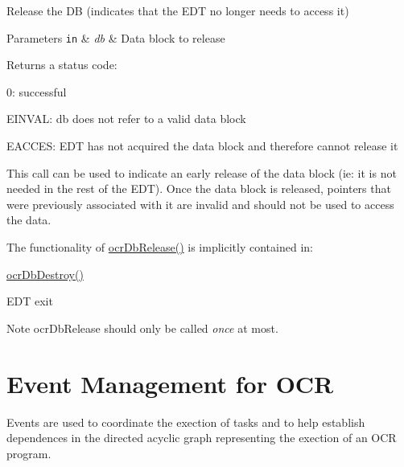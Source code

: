 Release the D\-B (indicates that the E\-D\-T no longer needs to access it)


\begin{DoxyParams}[1]{Parameters}
\mbox{\tt in}  & {\em db} & Data block to release\\
\hline
\end{DoxyParams}
\begin{DoxyReturn}{Returns}
a status code\-:
\begin{DoxyItemize}
\item 0\-: successful
\item E\-I\-N\-V\-A\-L\-: db does not refer to a valid data block
\item E\-A\-C\-C\-E\-S\-: E\-D\-T has not acquired the data block and therefore cannot release it
\end{DoxyItemize}
\end{DoxyReturn}

\descr
This call can be used to indicate an early release of the data block (ie\-: it is not needed in the rest of the E\-D\-T). Once the data block is released, pointers that were previously associated with it are invalid and should not be used to access the data.

The functionality of \hyperlink{group__OCRDataBlock_ga2ec03c0b0998bdaf9ccc44a06fb05ca0}{ocr\-Db\-Release()} is implicitly contained in\-:
\begin{DoxyItemize}
\item \hyperlink{group__OCRDataBlock_gabc80ea5594e5e55a541a1df4c7727821}{ocr\-Db\-Destroy()}
\item E\-D\-T exit
\end{DoxyItemize}

\begin{DoxyNote}{Note}
ocr\-Db\-Release should only be called {\itshape once} at most.
\end{DoxyNote}

\section{Event Management for OCR}
\label{sec:OCReventManagement}

Events are  used to coordinate the exection of tasks and to
help establish dependences in the directed acyclic graph representing the exection of an OCR program.


